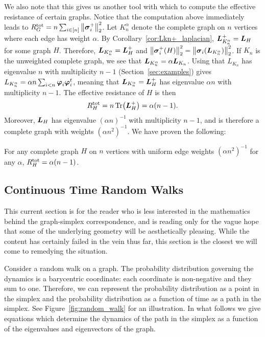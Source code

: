 We also note that this gives us another tool with  which to compute the effective resistance of certain graphs.  Notice that the computation above immediately leads to $R^{\textnormal{tot}}_G = n\sum_{i\in[n]}\norm{\vb*{\sigma}_i^+}_2^2$. Let $K_n^\alpha$ denote the complete graph on $n$ vertices where each edge has weight $\alpha$. By Corollary~\ref{cor:Lkn+_laplacian}, $\vb*{L}_{K_n^\alpha}^+=\vb*{L}_H$ for some graph $H$. Therefore, $\vb*{L}_{K_n^\alpha}=\vb*{L}_H^+$ and  $\norm{\vb*{\sigma}_i^+(H)}_2^2 = \norm{\vb*{\sigma}_i(\vb*{L}_{K_n^\alpha})}_2^2$.  If $K_n$ is the unweighted complete graph, we see that $\vb*{L}_{K_n^\alpha}=\alpha\vb*{L}_{K_n}$. Using  that $L_{K_n}$ has eigenvalue $n$ with multiplicity $n-1$  (Section~\ref{sec:examples}) gives $L_{K_n^\alpha}=\alpha n\sum_{i<n}\vb*{\varphi}_i\vb*{\varphi}_i^t$, meaning that $\vb*{L}_{K_n^\alpha}=\vb*{L}_H^+$ has eigenvalue $\alpha n$ with multiplicity $n-1$. The effective resistance of $H$ is then 
\begin{equation*}
R^{\textnormal{tot}}_H = n\Tr(\vb*{L}_H^+) = \alpha(n-1). 
\end{equation*}
Moreover, $\vb*{L}_H$ has eigenvalue $(\alpha n)^{-1}$ with multiplicity $n-1$, and  is therefore a complete graph with weights $(\alpha n^2)^{-1}$. We have proven the  following:  

\begin{lemma}
	For any complete graph $H$ on $n$ vertices with uniform edge weights  $(\alpha n^2)^{-1}$ for any $\alpha$,  $R^{\textnormal{tot}}_H = \alpha (n-1)$. 
\end{lemma}

\subsection{Continuous Time Random Walks}
\label{sec:random_walks}
This current section is for the reader who is less interested  in the  mathematics  behind the graph-simplex correspondence, and is reading only for the vague  hope  that some of the underlying geometry will be aesthetically pleasing. While  the  content has certainly failed in the vein thus far, this section  is the closest we will come to remedying the situation. 

Consider a  random walk on a graph. The probability distribution  governing the dynamics is a barycentric  coordinate: each coordinate is non-negative and they sum to one. Therefore, we can represent the probability distribution as a point in the simplex and the probability  distribution as a function of time as a path in the simplex. See Figure~\ref{fig:random_walk} for an illustration. In what follows we give equations which determine the dynamics of the path in the simplex as a function of the eigenvalues  and eigenvectors  of the graph. 


